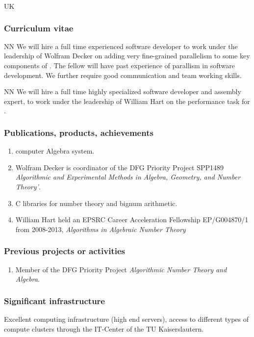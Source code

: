 \begin{sitedescription}{UK}
\subsubsection*{Curriculum vitae}




\begin{participant}[type=res,PM=48]{NN}
We will hire a full time experienced software developer to work
  under the leadership of Wolfram Decker on adding very fine-grained 
  parallelism to some key components of {}. The fellow
  will have past experience of parallism in software development.
  We further require good communication and team working
  skills.
\end{participant}

\begin{participant}[type=res,PM=12]{NN}
  We will hire a full time highly specialized software developer and
  assembly expert, to work under the leadership of William Hart on the
  performance task  for \MPIR.
\end{participant}

\subsubsection*{Publications, products, achievements}

\begin{enumerate}
\item {} computer Algebra system.
\item Wolfram Decker is coordinator of the DFG Priority Project SPP1489 \emph{Algorithmic and Experimental Methods in Algebra, Geometry, and
Number Theory'}.
\item {} C libraries for number theory and bignum arithmetic.
\item William Hart held an EPSRC Career Acceleration Fellowship EP/G004870/1 
from 2008-2013, \emph{Algorithms in Algebraic Number Theory}
\end{enumerate}

\subsubsection*{Previous projects or activities}

\begin{enumerate}
\item Member of the DFG Priority Project \emph{Algorithmic Number Theory and Algebra}.
\end{enumerate}

\subsubsection*{Significant infrastructure}

Excellent computing infrastructure (high end servers), access to 
different types of compute clusters through the IT-Center of the 
TU Kaiserslautern.
\end{sitedescription}



